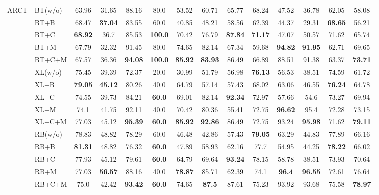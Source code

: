 \documentclass[11pt,a4paper]{article}
\begin{document}
\begin{table*}[th]
\begin{tabular}{ll|c|ccccccccccc}
	\midrule
\multirow{15}{*}{ARCT} 
 		    
                &  BT(w/o) &63.96&31.65&88.16&80.0&53.52&60.71&65.77&68.24&47.52&36.78&62.05&58.08
                						\\ 
		&  BT+B &68.47&\bf{37.04}&83.55&60.0&40.85&48.21&58.56&62.39&44.37&29.31&\bf{68.65}&56.21
 						        \\ 
		&  BT+C & \bf{68.92} &36.7&85.53&\bf{100.0}&70.42&76.79&\bf{87.84}&\bf{71.17}&47.07&50.57&71.62&65.74
 						        \\ 
		   & BT+M &67.79&32.32&91.45&80.0&74.65&82.14&67.34&59.68&\bf{94.82}&\bf{91.95}&62.71&69.65
 						       \\ 
		   & BT+C+M& 67.57&36.36&\bf{94.08}&\bf{100.0}&\bf{85.92}&\bf{83.93}&86.49&66.89&88.51&91.38&63.37&\bf{73.71}
		
 					     	       \\ \cmidrule{2-14}
						          
			&  XL(w/o) & 75.45&39.39&72.37&20.0&30.99&51.79&56.98&\bf{76.13}&56.53&38.51&74.59&61.72
                						\\ 
		&  XL+B & \bf{79.05}&\bf{45.12}&80.26&40.0&64.79&57.14&57.43&68.02&63.06&46.55&\bf{76.24}&64.78
 						        \\ 
		&  XL+C & 74.55&39.73&84.21&\bf{60.0}&69.01&82.14&\bf{92.34}&72.97&57.66&54.6&73.27&69.94
 						        \\ 
		   & XL+M & 74.1&41.75&92.11&40.0&70.42&80.36&55.41&72.75&\bf{96.62}&95.4&72.28&73.15
 						       \\ 
		   & XL+C+M& 77.03&45.12&\bf{95.39}&\bf{60.0}&\bf{85.92}&\bf{92.86}&86.49&72.75&93.24&\bf{95.98}&71.62&\bf{79.11}
 					     	       \\ \cmidrule{2-14}
	&  RB(w/o) & 78.83&48.82&78.29&60.0&46.48&42.86&57.43&\bf{79.05}&63.29&44.83&77.89&66.16
                						\\ 
		&  RB+B & \bf{81.31}&48.82&76.32&\bf{60.0}&47.89&58.93&62.16&77.7&54.95&44.25&\bf{78.22}&66.02
 						        \\ 
		&  RB+C &77.93&45.12&79.61&\bf{60.0}&64.79&69.64&\bf{93.24}&78.15&58.78&38.51&73.93&70.64
 						        \\ 
		   & RB+M & 77.03&\bf{56.57}&88.16&40.0&\bf{78.87}&85.71&62.39&74.1&\bf{96.4}&\bf{96.55}&72.61&76.64
 						       \\ 
		   & RB+C+M&75.0&42.42&\bf{93.42}&\bf{60.0}&74.65&\bf{87.5}&87.61&75.23&93.92&93.68&75.58&\bf{78.97}
 					     	       \\ 


\end{tabular}
\end{table*}
\end{document}
